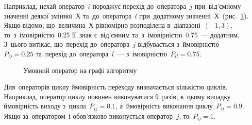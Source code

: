 \documentclass[
	a4paper,
	oneside,
	BCOR = 10mm,
	DIV = 12,
	12pt,
	headings = normal,
]{scrartcl}
\begin{document}
		Наприклад, нехай оператор~$i$ породжує перехід до~оператора~$j$ при~від'\-єм\-но\-му значенні деякої змінної~$Х$ та~до~оператора~$l$ при~додатному значенні~$Х$~(рис.~\ref{fig:graph-alg2}). Якщо відомо, що~величина~$Х$ рівномірно розподілена в~діапазоні~$(-1, 3)$, то~з~імовірністю~\num{0.25} її~знак є~від'\-єм\-ним та~з~імовірністю~\num{0.75}~— додатним. З~цього витікає, що~перехід до~оператора~$j$ відбувається з~ймовірністю~$P_{ij} = \num{0.25}$ та~перехід до~оператора~$l$~— з~імовірністю~$P_{il} = \num{0.75}$.

		\begin{figure}[!htbp]
			\centering
			\caption{Умовний оператор на графі алгоритму}
			\label{fig:graph-alg2}
		\end{figure}

		Для~операторів циклу ймовірність переходу визначається кількістю циклів. Наприклад, оператор циклу повинен виконуватися 9~разів, в~цьому випадку ймовірність виходу з~цикла~$P_{ij} = \num{0.1}$, а~ймовірність виконання циклу~$P_{ij} = \num{0,9}$. Якщо за~оператором~$і$ обов'\-яз\-ко\-во виконується оператор~$j$, то~$P_{ij} = 1$.
\end{document}
